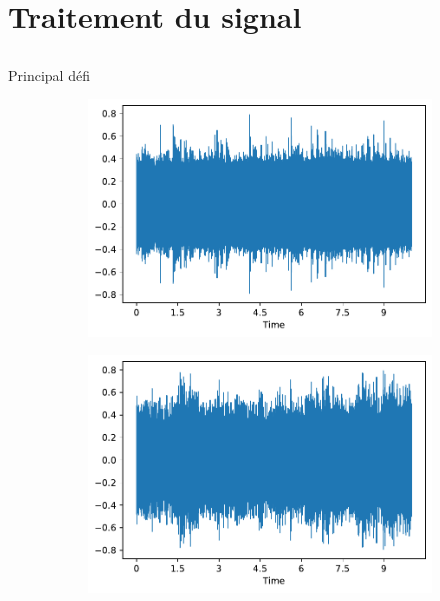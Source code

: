 \documentclass[compress,xcolor=table]{beamer}
\begin{document}
\section{Traitement du signal} \subsection{}

\begin{frame}{Principal défi}

    \begin{figure}[ht]
        \centering
        \begin{subfigure}[b]{0.45\textwidth}
            \centering
            \includegraphics[width=\textwidth]{../images/audio/birds.wave.birdvox.pdf}
            \label{fig:birds.wave.birdvox}
        \end{subfigure}
        \hfill
        \begin{subfigure}[b]{0.45\textwidth}
            \centering
            \includegraphics[width=\textwidth]{../images/audio/nobirds.wave.birdvox.pdf}
            \label{fig:nobirds.wave.birdvox}
        \end{subfigure}


\end{figure}
\end{frame}
\end{document}
